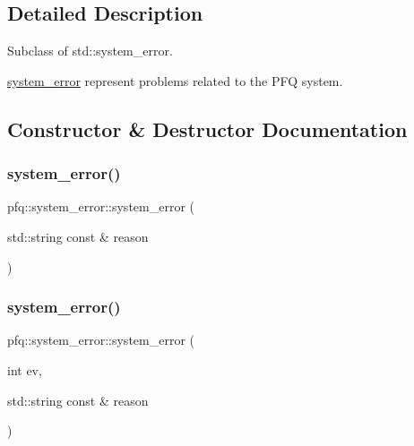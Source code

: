 \subsection{Detailed Description}
Subclass of std\+::system\+\_\+error. 

\hyperlink{classpfq_1_1system__error}{system\+\_\+error} represent problems related to the P\+FQ system. 

\subsection{Constructor \& Destructor Documentation}
\mbox{\label{classpfq_1_1system__error_ab7d95c442ad80d82ad0833c446b592fb}} 
\subsubsection{\texorpdfstring{system\+\_\+error()}{system\_error()}\hspace{0.1cm}{\footnotesize\ttfamily [1/5]}}
{\footnotesize\ttfamily pfq\+::system\+\_\+error\+::system\+\_\+error (\begin{DoxyParamCaption}\item[{std\+::string const \&}]{reason }\end{DoxyParamCaption})\hspace{0.3cm}{\ttfamily [inline]}}

\mbox{\label{classpfq_1_1system__error_ac58f673c8a80a307d73dbd6fc8c929e9}} 
\subsubsection{\texorpdfstring{system\+\_\+error()}{system\_error()}\hspace{0.1cm}{\footnotesize\ttfamily [2/5]}}
{\footnotesize\ttfamily pfq\+::system\+\_\+error\+::system\+\_\+error (\begin{DoxyParamCaption}\item[{int}]{ev,  }\item[{std\+::string const \&}]{reason }\end{DoxyParamCaption})\hspace{0.3cm}{\ttfamily [inline]}}

